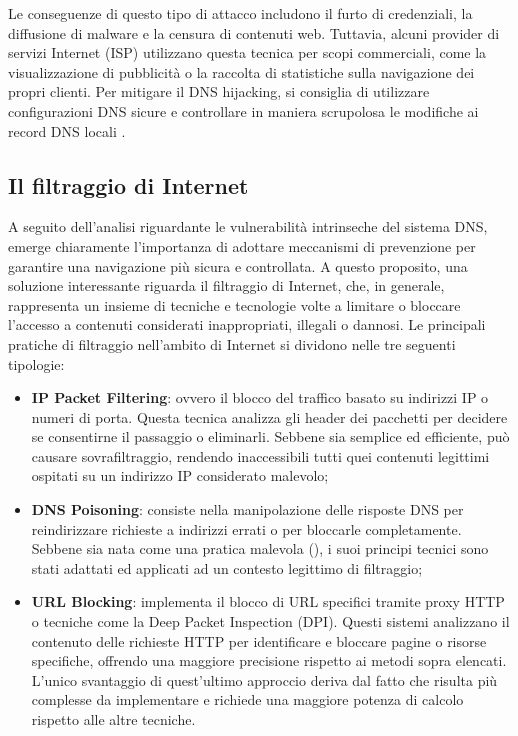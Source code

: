 Le conseguenze di questo tipo di attacco includono il furto di credenziali, la diffusione di malware e la censura di contenuti web. Tuttavia, alcuni provider di servizi Internet (ISP) utilizzano questa tecnica per scopi commerciali, come la visualizzazione di pubblicità o la raccolta di statistiche sulla navigazione dei propri clienti. Per mitigare il DNS hijacking, si consiglia di utilizzare configurazioni DNS sicure e controllare in maniera scrupolosa le modifiche ai record DNS locali \cite{hudaib2014dns}.

\subsection{Il filtraggio di Internet}
A seguito dell'analisi riguardante le vulnerabilità intrinseche del sistema DNS, emerge chiaramente l'importanza di adottare meccanismi di prevenzione per garantire una navigazione più sicura e controllata. A questo proposito, una soluzione interessante riguarda il filtraggio di Internet, che, in generale, rappresenta un insieme di tecniche e tecnologie volte a limitare o bloccare l'accesso a contenuti considerati inappropriati, illegali o dannosi. Le principali pratiche di filtraggio nell'ambito di Internet si dividono nelle tre seguenti tipologie:
\begin{itemize}
  \item \textbf{IP Packet Filtering}: ovvero il blocco del traffico basato su indirizzi IP o numeri di porta. Questa tecnica analizza gli header dei pacchetti per decidere se consentirne il passaggio o eliminarli. Sebbene sia semplice ed efficiente, può causare sovrafiltraggio, rendendo inaccessibili tutti quei contenuti legittimi ospitati su un indirizzo IP considerato malevolo;

  \item \textbf{DNS Poisoning}: consiste nella manipolazione delle risposte DNS per reindirizzare richieste a indirizzi errati o per bloccarle completamente. Sebbene sia nata come una pratica malevola (), i suoi principi tecnici sono stati adattati ed applicati ad un contesto legittimo di filtraggio;

  \item \textbf{URL Blocking}: implementa il blocco di URL specifici tramite proxy HTTP o tecniche come la Deep Packet Inspection (DPI). Questi sistemi analizzano il contenuto delle richieste HTTP per identificare e bloccare pagine o risorse specifiche, offrendo una maggiore precisione rispetto ai metodi sopra elencati. L'unico svantaggio di quest'ultimo approccio deriva dal fatto che risulta più complesse da implementare e richiede una maggiore potenza di calcolo rispetto alle altre tecniche.
\end{itemize}

